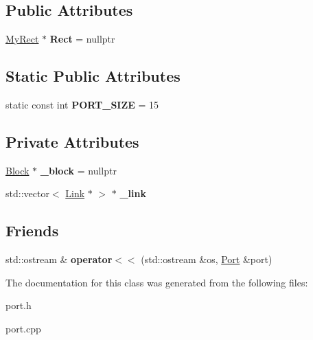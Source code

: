 \subsection*{Public Attributes}
\begin{DoxyCompactItemize}
\item 
\mbox{\label{classPort_a15b32bc9451ca7d7151b58d31db430f9}} 
\hyperlink{classMyRect}{My\+Rect} $\ast$ {\bfseries Rect} = nullptr
\end{DoxyCompactItemize}
\subsection*{Static Public Attributes}
\begin{DoxyCompactItemize}
\item 
\mbox{\label{classPort_ad6196c80ef79bc8d84150212038ae5c0}} 
static const int {\bfseries P\+O\+R\+T\+\_\+\+S\+I\+ZE} = 15
\end{DoxyCompactItemize}
\subsection*{Private Attributes}
\begin{DoxyCompactItemize}
\item 
\mbox{\label{classPort_acbbb0080ccd9b20d88ecb6e25b1213a6}} 
\hyperlink{classBlock}{Block} $\ast$ {\bfseries \+\_\+block} = nullptr
\item 
\mbox{\label{classPort_a42ba9edd977209caa3e4892fe03e2a0c}} 
std\+::vector$<$ \hyperlink{classLink}{Link} $\ast$ $>$ $\ast$ {\bfseries \+\_\+link}
\end{DoxyCompactItemize}
\subsection*{Friends}
\begin{DoxyCompactItemize}
\item 
\mbox{\label{classPort_a211c4d37a5ac4906b999e74097f9ae43}} 
std\+::ostream \& {\bfseries operator$<$$<$} (std\+::ostream \&os, \hyperlink{classPort}{Port} \&port)
\end{DoxyCompactItemize}


The documentation for this class was generated from the following files\+:\begin{DoxyCompactItemize}
\item 
port.\+h\item 
port.\+cpp\end{DoxyCompactItemize}
